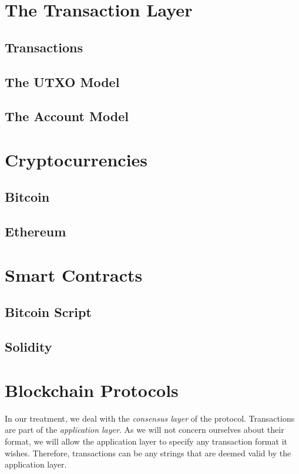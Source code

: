 \section{The Transaction Layer}
\subsection{Transactions}
\subsection{The UTXO Model}
\subsection{The Account Model}

\section{Cryptocurrencies}

\subsection{Bitcoin}
\subsection{Ethereum}

\section{Smart Contracts}
\subsection{Bitcoin Script}
\subsection{Solidity}


\section{Blockchain Protocols}

In our treatment, we deal with the \emph{consensus layer}
of the protocol. Transactions are part of the
\emph{application layer}. As we will not concern
ourselves about their format, we will allow the application layer to specify any
transaction format it wishes. Therefore, transactions can be any strings that
are deemed valid by the application layer.

